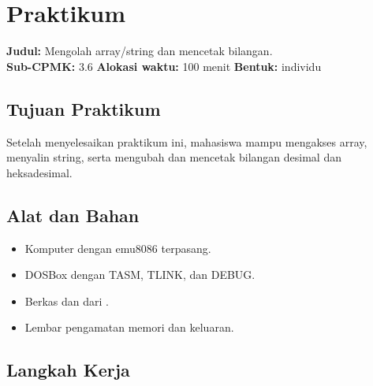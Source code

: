 \section{Praktikum}
\label{sec:praktikum-bab15}

\begin{praktikumbox}
\vspace{1.1em}
\textbf{Judul:} Mengolah array/string dan mencetak bilangan.\\[0.3em]
\textbf{Sub-CPMK:} 3.6 \quad\textbullet\quad
\textbf{Alokasi waktu:} 100 menit \quad\textbullet\quad
\textbf{Bentuk:} individu
\end{praktikumbox}

\subsection{Tujuan Praktikum}

Setelah menyelesaikan praktikum ini, mahasiswa mampu mengakses array,
menyalin string, serta mengubah dan mencetak bilangan desimal dan
heksadesimal.

\subsection{Alat dan Bahan}

\begin{itemize}
    \item Komputer dengan emu8086 terpasang.
    \item DOSBox dengan TASM, TLINK, dan DEBUG.
    \item Berkas  dan
           dari .
    \item Lembar pengamatan memori dan keluaran.
\end{itemize}

\subsection{Langkah Kerja}

